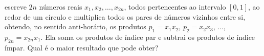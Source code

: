  escreve $2n$ números reais $x_1, x_2, \dots, x_{2n}$, todos pertencentes ao intervalo $[0,1]$, ao redor de um círculo e multiplica todos os pares de números vizinhos entre si, obtendo, no sentido anti-horário, os produtos $p_1 = x_1 x_2$, $p_2 = x_2 x_3$, $\dots$, $p_{2n} = x_{2n} x_1$. Ela soma os produtos de índice par e subtrai os produtos de índice ímpar. Qual é o maior resultado que  pode obter?